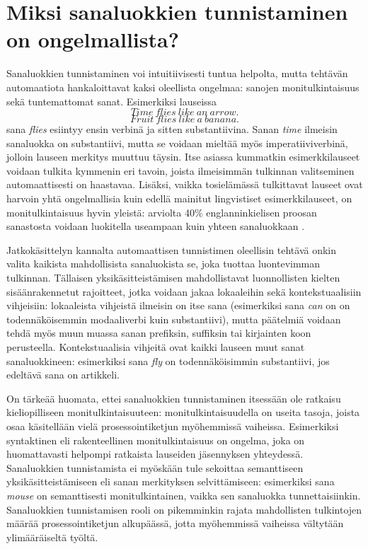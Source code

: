 \documentclass[utf8,bachelor,manualbib]{gradu3}
\begin{document}
\section{Miksi sanaluokkien tunnistaminen on ongelmallista?}

Sanaluokkien tunnistaminen voi intuitiivisesti tuntua helpolta, mutta tehtävän automaatiota hankaloittavat kaksi oleellista ongelmaa: sanojen monitulkintaisuus sekä tuntemattomat sanat. Esimerkiksi lauseissa
\[Time\: flies\: like\: an\: arrow.\]
\[Fruit\: flies\: like\: a\: banana.\]
sana \textit{flies} esiintyy ensin verbinä ja sitten substantiivina. Sanan \textit{time} ilmeisin sanaluokka on substantiivi, mutta se voidaan mieltää myös imperatiiviverbinä, jolloin lauseen merkitys muuttuu täysin. Itse asiassa kummatkin esimerkkilauseet voidaan tulkita kymmenin eri tavoin, joista ilmeisimmän tulkinnan valitseminen automaattisesti on haastavaa. Lisäksi, vaikka tosielämässä tulkittavat lauseet ovat harvoin yhtä ongelmallisia kuin edellä mainitut lingvistiset esimerkkilauseet, on monitulkintaisuus hyvin yleistä: arviolta 40\% englanninkielisen proosan sanastosta voidaan luokitella useampaan kuin yhteen sanaluokkaan \citep{derose1988}. 

Jatkokäsittelyn kannalta automaattisen tunnistimen oleellisin tehtävä onkin valita kaikista mahdollisista sanaluokista se, joka tuottaa luontevimman tulkinnan. Tällaisen yksikäsitteistämisen mahdollistavat luonnollisten kielten sisäänrakennetut rajoitteet, jotka voidaan jakaa lokaaleihin sekä kontekstuaalisiin vihjeisiin: lokaaleista vihjeistä ilmeisin on itse sana (esimerkiksi sana \textit{can} on on todennäköisemmin modaaliverbi kuin substantiivi), mutta päätelmiä voidaan tehdä myös muun muassa sanan prefiksin, suffiksin tai kirjainten koon perusteella. Kontekstuaalisia vihjeitä ovat kaikki lauseen muut sanat sanaluokkineen: esimerkiksi sana \textit{fly} on todennäköisimmin substantiivi, jos edeltävä sana on artikkeli.

On tärkeää huomata, ettei sanaluokkien tunnistaminen itsessään ole ratkaisu kieliopilliseen monitulkintaisuuteen: monitulkintaisuudella on useita tasoja, joista osaa käsitellään vielä prosessointiketjun myöhemmissä vaiheissa. Esimerkiksi syntaktinen eli rakenteellinen monitulkintaisuus on ongelma, joka on huomattavasti helpompi ratkaista lauseiden jäsennyksen yhteydessä. Sanaluokkien tunnistamista ei myöskään tule sekoittaa semanttiseen yksikäsitteistämiseen eli sanan merkityksen selvittämiseen: esimerkiksi sana \textit{mouse} on semanttisesti monitulkintainen, vaikka sen sanaluokka tunnettaisiinkin. Sanaluokkien tunnistamisen rooli on pikemminkin rajata mahdollisten tulkintojen määrää prosessointiketjun alkupäässä, jotta myöhemmissä vaiheissa vältytään ylimääräiseltä työltä. \citep[s. 341]{manning1999}
\end{document}

